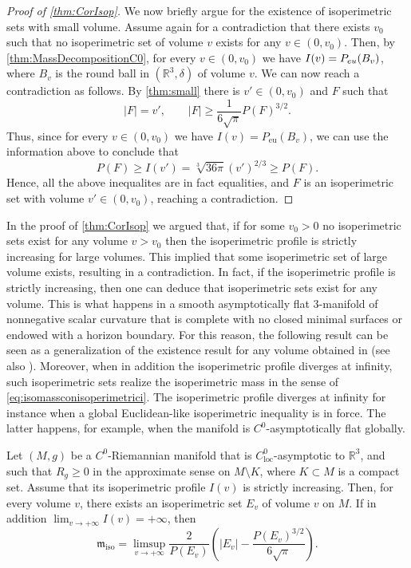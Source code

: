 \documentclass[a4paper,12pt,reqno]{amsart}
\numberwithin{equation}{section}
\theoremstyle{plain}
\theoremstyle{definition}
\theoremstyle{remark}
\newcommand{\R}{\mathbb{R}}
\begin{document}
{\begin{proof}[Proof of \cref{thm:CorIsop}]
We now briefly argue for the existence of isoperimetric sets with small volume. Assume again for a contradiction that there exists $v_0$ such that no isoperimetric set of volume $v$ exists for any $v \in (0, v_0)$. Then, by \cref{thm:MassDecompositionC0}, for every $v\in (0,v_0)$ we have $I(v) = P_{\rm eu}(B_v)$, where $B_v$ is the round ball in $(\R^3, \delta)$ of volume $v$. We can now reach a contradiction as follows. By \cref{thm:small} there is $v'\in (0,v_0)$ and $F$ such that 
\[
|F|=v', \qquad |F|\geq \frac{1}{6\sqrt{\pi}}P(F)^{3/2}.
\]
Thus, since for every $v\in (0,v_0)$ we have $I(v)=P_{\mathrm{eu}}(B_v)$, we can use the information above to conclude that 
\[
P(F)\geq I(v')= \sqrt[3]{36\pi} (v')^{2/3} \geq P(F).
\]
Hence, all the above inequalites are in fact equalities, and $F$ is an isoperimetric set with volume $v'\in (0,v_0)$, reaching a contradiction.
\end{proof}


In the proof of \cref{thm:CorIsop} we argued that, if for some $v_0 > 0$ no isoperimetric sets exist for any volume $v > v_0$  then 
the isoperimetric profile is strictly increasing for large volumes. This implied that some isoperimetric set of large volume exists, resulting in a contradiction. In fact, if the isoperimetric profile is strictly increasing, then one can deduce that isoperimetric sets exist for any volume. This is what happens in a smooth asymptotically flat $3$-manifold of nonnegative scalar curvature that is complete with no closed minimal surfaces or endowed with a horizon boundary. For this reason, the following result can be seen as a generalization of the existence result for any volume obtained in \cite[Proposition K.1]{CarlottoChodoshEichmair} (see also \cite[Theorem 3.6]{BFSurvey}). Moreover, when 
in addition the isoperimetric profile diverges at infinity, such isoperimetric sets realize the isoperimetric mass in the sense of \eqref{eq:isomassconisoperimetrici}.
The isoperimetric profile diverges at infinity for instance when a global Euclidean-like isoperimetric inequality is in force. The latter happens, for example, when the manifold is $C^0$-asymptotically flat globally.


\begin{proposition}
\label{prop:profileincreasing}
Let $(M, g)$ be a $C^0$-Riemannian manifold that is $C^0_{\mathrm{loc}}$-asymptotic to $\mathbb R^3$, and such that $R_g\geq 0$ in the approximate sense on $M\setminus K$, where $K\subset M$ is a compact set. Assume  that its isoperimetric profile $I(v)$ is strictly increasing. Then, for every volume $v$, there exists an isoperimetric set $E_v$ of volume $v$ on $M$. If in addition $\lim_{v \to + \infty} I(v) = + \infty$, then
\begin{equation}
\label{eq:isomassconisoperimetrici}
    \mathfrak{m}_{\mathrm{iso}} = \limsup_{v \to +\infty} \frac{2}{P(E_v)}\left(|E_v|-\frac{P(E_v)^{3/2}}{6\sqrt{\pi}}\right).
\end{equation}
\end{proposition}

}
\end{document}
